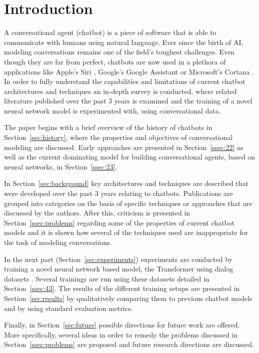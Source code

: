 \documentclass[12pt]{article}
\begin{document}
\newpage\tableofcontents
\newpage\section{Introduction} \label{sec:intro}

A conversational agent (chatbot) is a piece of software that is able to communicate with humans using natural language. Ever since the birth of AI, modeling conversations remains one of the field's toughest challenges. Even though they are far from perfect, chatbots are now used in a plethora of applications like Apple's Siri \cite{Siri:2017}, Google's Google Assistant \cite{Google:2017} or Microsoft's Cortana \cite{Cortana:2017}. In order to fully understand the capabilities and limitations of current chatbot architectures and techniques an in-depth survey is conducted, where related literature published over the past 3 years is examined and the training of a novel neural network model is experimented with, using conversational data. 

The paper begins with a brief overview of the history of chatbots in Section~\ref{sec:history}, where the properties and objectives of conversational modeling are discussed. Early approaches are presented in Section~\ref{ssec:22} as well as the current dominating model for building conversational agents, based on neural networks, in Section~\ref{ssec:23}.

In Section~\ref{sec:background} key architectures and techniques are described that were developed over the past 3 years relating to chatbots. Publications are grouped into categories on the basis of specific techniques or approaches that are discussed by the authors. After this, criticism is presented in Section~\ref{ssec:problems} regarding some of the properties of current chatbot models and it is shown how several of the techniques used are inappropriate for the task of modeling conversations.

In the next part (Section~\ref{sec:experiments}) experiments are conducted by training a novel neural network based model, the Transformer \cite{Vaswani:2017} using dialog datasets \cite{Danescu:2011,Tiedemann:2009,OpenSubtitles:2016}. Several trainings are run using these datasets detailed in Section~\ref{ssec:43}. The results of the different training setups are presented in Section~\ref{sec:results} by qualitatively comparing them to previous chatbot models and by using standard evaluation metrics.

Finally, in Section~\ref{sec:future} possible directions for future work are offered. More specifically, several ideas in order to remedy the problems discussed in Section~\ref{ssec:problems} are proposed and future research directions are discussed.
\end{document}
